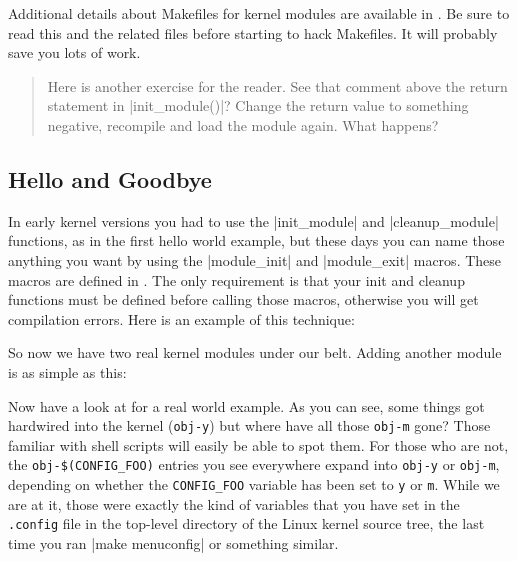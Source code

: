 \documentclass[10pt, oneside]{book}
\begin{document}
\begin{enumerate}
        Additional details about Makefiles for kernel modules are available in .
        Be sure to read this and the related files before starting to hack Makefiles. It will probably save you lots of work.

\begin{quote}
Here is another exercise for the reader.
See that comment above the return statement in \cpp|init_module()|?
Change the return value to something negative, recompile and load the module again.
What happens?
\end{quote}
\end{enumerate}

\subsection{Hello and Goodbye}
\label{sec:hello_n_goodbye}
In early kernel versions you had to use the \cpp|init_module| and \cpp|cleanup_module| functions, as in the first hello world example,
but these days you can name those anything you want by using the \cpp|module_init| and \cpp|module_exit| macros.
These macros are defined in .
The only requirement is that your init and cleanup functions must be defined before calling those macros, otherwise you will get compilation errors.
Here is an example of this technique:


So now we have two real kernel modules under our belt. Adding another module is as simple as this:


Now have a look at  for a real world example.
As you can see, some things got hardwired into the kernel (\verb|obj-y|) but where have all those \verb|obj-m| gone?
Those familiar with shell scripts will easily be able to spot them.
For those who are not, the \verb|obj-$(CONFIG_FOO)| entries you see everywhere expand into \verb|obj-y| or \verb|obj-m|,
depending on whether the \verb|CONFIG_FOO| variable has been set to \verb|y| or \verb|m|.
While we are at it, those were exactly the kind of variables that you have set in the \verb|.config| file in the top-level directory of the Linux kernel source tree,
the last time you ran \sh|make menuconfig| or something similar.
\end{document}
